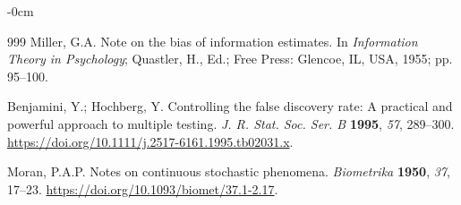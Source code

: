 \documentclass[applsci,article,accept,moreauthors]{Definitions/mdpi}
\begin{document}
\begin{adjustwidth}{-\extralength}{0cm}
\begin{thebibliography}{999}
Miller, G.A. Note on the bias of information estimates. In \emph{Information Theory in Psychology}; Quastler, H., Ed.; Free Press: Glencoe, IL, USA, 1955; pp. 95--100.

Benjamini, Y.; Hochberg, Y. Controlling the false discovery rate: A
practical and powerful approach to multiple testing. \emph{J. R. Stat. Soc.
Ser. B} \textbf{1995}, \emph{57}, 289--300.
\url{https://doi.org/10.1111/j.2517-6161.1995.tb02031.x}.

Moran, P.A.P. Notes on continuous stochastic phenomena.
\emph{Biometrika} \textbf{1950}, \emph{37}, 17--23.
\url{https://doi.org/10.1093/biomet/37.1-2.17}.



\end{thebibliography}

\PublishersNote{}
\end{adjustwidth}
\end{document}
